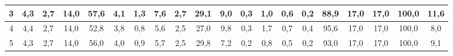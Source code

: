 \begin{sidewaystable}[]
\begin{tabular}{|c|c|c|c|c|c|c|c|c|c|c|c|c|c|c|c|c|c|c|c|}
    3  & 4,3                                              & 2,7                                              & 14,0                                             & 57,6                                             & 4,1                                              & 1,3                                              & 7,6                                              & 2,7                                              & 29,1                                             & 9,0                                              & 0,3                                              & 1,0                                              & 0,6                                              & 0,2                                              & 88,9                                            & 17,0                                            & 17,0                                            & 100,0                                           & 11,6                                            \\ \hline
    4  & 4,4                                              & 2,7                                              & 14,0                                             & 52,8                                             & 3,8                                              & 0,8                                              & 5,6                                              & 2,5                                              & 27,0                                             & 9,8                                              & 0,3                                              & 1,7                                              & 0,7                                              & 0,4                                              & 95,6                                            & 17,0                                            & 17,0                                            & 100,0                                           & 8,0                                             \\ \hline
    5  & 4,3                                              & 2,7                                              & 14,0                                             & 56,0                                             & 4,0                                              & 0,9                                              & 5,7                                              & 2,5                                              & 29,8                                             & 7,2                                              & 0,2                                              & 0,8                                              & 0,5                                              & 0,2                                              & 93,0                                            & 17,0                                            & 17,0                                            & 100,0                                           & 9,1                                             \\ \hline

\end{tabular}
\end{sidewaystable}
